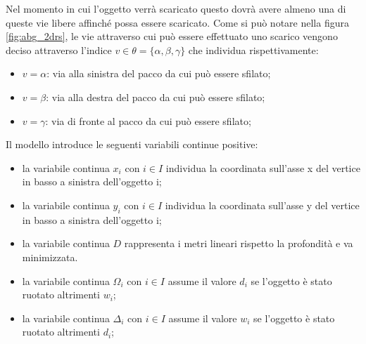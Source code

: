 Nel momento in cui l'oggetto verrà scaricato questo dovrà avere almeno una di queste vie libere affinché possa essere scaricato.
Come si può notare nella figura \ref{fig:abg_2drs}, le vie attraverso cui può essere effettuato uno scarico vengono deciso attraverso l'indice $v \in \theta = \{\alpha,\beta,\gamma\}$ che individua rispettivamente:
\begin{itemize}
	\item $v = \alpha$: via alla sinistra del pacco da cui può essere sfilato; 
	\item $v = \beta$: via alla destra del pacco da cui può essere sfilato; 
	\item $v = \gamma$: via di fronte al pacco da cui può essere sfilato; 
\end{itemize}

Il modello introduce le seguenti variabili continue positive:
\begin{itemize}
	\item la variabile continua $x_{i}$ con $i \in I$ individua la coordinata sull'asse x del vertice in basso a sinistra dell'oggetto i;
	\item la variabile continua $y_{i}$ con $i \in I$ individua la coordinata sull'asse y del vertice in basso a sinistra dell'oggetto i;
	\item la variabile continua $D$ rappresenta i metri lineari rispetto la profondità e va minimizzata.
	\item la variabile continua $\Omega_{i}$ con $i \in I$ assume il valore $d_i$ se l'oggetto è stato ruotato altrimenti $w_i$;
	\item la variabile continua $\Delta_{i}$ con $i \in I$ assume il valore $w_i$ se l'oggetto è stato ruotato altrimenti $d_i$;
\end{itemize}

